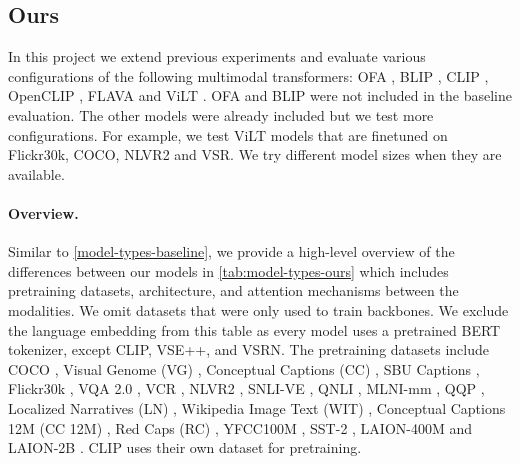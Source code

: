 \subsection{Ours}
In this project we extend previous experiments and evaluate various configurations of the following multimodal transformers: OFA \cite{wang2022unifying}, BLIP \cite{li2022blip}, CLIP \cite{radford2021clip}, OpenCLIP \cite{ilharco_gabriel_2021_5143773}, FLAVA \cite{singh2022flava} and ViLT \cite{kim2021vilt}. OFA and BLIP were not included in the baseline evaluation. The other models were already included but we test more configurations. For example, we test ViLT models that are finetuned on Flickr30k, COCO, NLVR2 and VSR. We try different model sizes when they are available.

\paragraph{Overview.}
Similar to \cref{model-types-baseline}, we provide a high-level overview of the differences between our models in \cref{tab:model-types-ours} which includes pretraining datasets, architecture, and attention mechanisms between the modalities. We omit datasets that were only used to train backbones. We exclude the language embedding from this table as every model uses a pretrained BERT tokenizer, except CLIP, VSE++, and VSRN. The pretraining datasets include COCO \cite{lin2014microsoft}, Visual Genome (VG) \cite{krishna2016visual}, Conceptual Captions (CC) \cite{sharma2018conceptual}, SBU Captions \cite{ordonez2011im2text}, Flickr30k \cite{young2014image}, VQA 2.0 \cite{goyal2017making}, VCR \cite{zellers2019recognition}, NLVR2 \cite{suhr2017corpus}, SNLI-VE \cite{xie2018visual}, QNLI \cite{rajpurkar2016squad}, MLNI-mm \cite{williams2017broad}, QQP \cite{QQPDataset}, Localized Narratives (LN) \cite{pont-tuset2020localized-narratives}, Wikipedia Image Text (WIT) \cite{srinivasan2021wit}, Conceptual Captions 12M (CC 12M) \cite{changpinyo2021conceptual12m}, Red Caps (RC) \cite{desai2021redcaps}, YFCC100M \cite{thomee2016yfcc100m}, SST-2 \cite{Socher2013RecursiveDM}, LAION-400M \cite{schuhmann2021laion} and LAION-2B \cite{schuhmann2022laionb}. CLIP uses their own dataset for pretraining.

